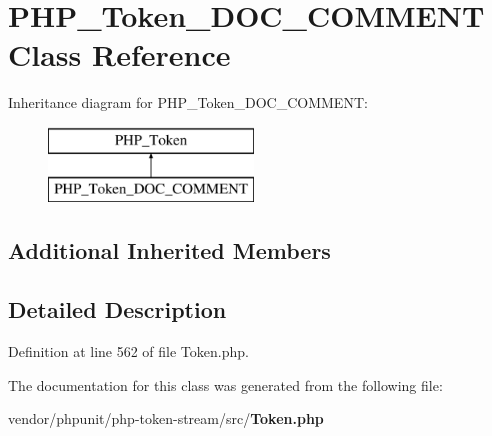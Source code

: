 \section{P\+H\+P\+\_\+\+Token\+\_\+\+D\+O\+C\+\_\+\+C\+O\+M\+M\+E\+N\+T Class Reference}
\label{class_p_h_p___token___d_o_c___c_o_m_m_e_n_t}
Inheritance diagram for P\+H\+P\+\_\+\+Token\+\_\+\+D\+O\+C\+\_\+\+C\+O\+M\+M\+E\+N\+T\+:\begin{figure}[H]
\begin{center}
\leavevmode
\includegraphics[height=2.000000cm]{class_p_h_p___token___d_o_c___c_o_m_m_e_n_t}
\end{center}
\end{figure}
\subsection*{Additional Inherited Members}


\subsection{Detailed Description}


Definition at line 562 of file Token.\+php.



The documentation for this class was generated from the following file\+:\begin{DoxyCompactItemize}
\item 
vendor/phpunit/php-\/token-\/stream/src/{\bf Token.\+php}\end{DoxyCompactItemize}
